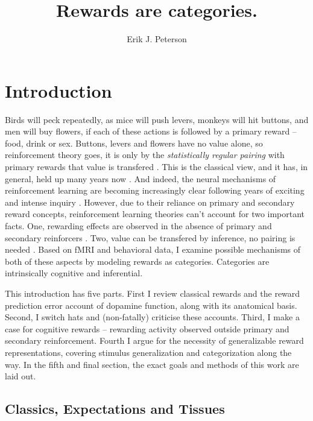 \documentclass[doc,12pt]{apa}        %
\title{Rewards are categories.}
\author{Erik J. Peterson} \affiliation{Dept. of Psychology \\ Colorado State University \\ Fort Collins, CO}
\begin{document}
 
\maketitle
\doublespacing

\section{Introduction} %
\label{sec:introduction}
Birds will peck repeatedly, as mice will push levers, monkeys will hit buttons, and men will buy flowers, if each of these actions is followed by a primary reward -- food, drink or sex.  Buttons, levers and flowers have no value alone, so reinforcement theory goes, it is only by the \emph{statistically regular pairing} with primary rewards that value is transfered \cite{Rescorla:1988p8743}.  This is the classical view, and it has, in general, held up many years now \cite{iversen:2007aa}.  And indeed, the neural mechanisms of reinforcement learning are becoming increasingly clear following years of exciting and intense inquiry \cite{Glimcher:2011p8464, Montague:2006mz}.  However, due to their reliance on primary and secondary reward concepts, reinforcement learning theories can't account for two important facts.  One, rewarding effects are observed in the absence of primary and secondary reinforcers \cite{Hayden:2009p6545, Lohrenz:2007p7240, Tricomi:2008p6663, Jimura:2010p8305}. Two, value can be transfered by inference, no pairing is needed \cite{BrombergMartin:2010p7223, Hampton:2006p2577}.  Based on fMRI and behavioral data, I examine possible mechanisms of both of these aspects by modeling rewards as categories.  Categories are intrinsically cognitive and inferential.

This introduction has five parts.  First I review classical rewards and the reward prediction error account of dopamine function, along with its anatomical basis.  Second, I switch hats and (non-fatally) criticise these accounts. Third, I make a case for cognitive rewards -- rewarding activity observed outside primary and secondary reinforcement. Fourth I argue for the necessity of generalizable reward representations, covering stimulus generalization and categorization along the way.  In the fifth and final section, the exact goals and methods of this work are laid out.

\subsection{Classics, Expectations and Tissues} %
\label{sub:c_and_e}
\end{document}
